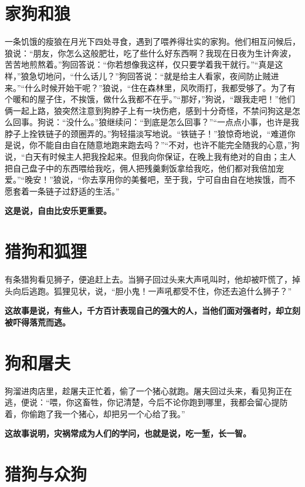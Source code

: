 \section{家狗和狼}

一条饥饿的瘦狼在月光下四处寻食，遇到了喂养得壮实的家狗。他们相互问候后，狼说：“朋友，你怎么这般肥壮，吃了些什么好东西啊？我现在日夜为生计奔波，苦苦地煎熬着。”狗回答说：“你若想像我这样，仅只要学着我干就行。”“真是这样，”狼急切地问，“什么话儿？”狗回答说：“就是给主人看家，夜间防止贼进来。”“什么时候开始干呢？”狼说，“住在森林里，风吹雨打，我都受够了。为了有个暖和的屋子住，不挨饿，做什么我都不在乎。”“那好，”狗说，“跟我走吧！”他们俩一起上路，狼突然注意到狗脖子上有一块伤疤，感到十分奇怪，不禁问狗这是怎么回事。狗说：“没什么。”狼继续问：“到底是怎么回事？”“一点点小事，也许是我脖子上拴铁链子的颈圈弄的。”狗轻描淡写地说。“铁链子！”狼惊奇地说，“难道你是说，你不能自由自在随意地跑来跑去吗？”“不对，也许不能完全随我的心意，”狗说，“白天有时候主人把我拴起来。但我向你保证，在晚上我有绝对的自由；主人把自己盘子中的东西喂给我吃，佣人把残羹剩饭拿给我吃，他们都对我倍加宠爱。”“晚安！”狼说，“你去享用你的美餐吧，至于我，宁可自由自在地挨饿，而不愿套着一条链子过舒适的生活。”

{\bfseries \color{red}这是说，自由比安乐更重要。}

\section{猎狗和狐狸}

有条猎狗看见狮子，便追赶上去。当狮子回过头来大声吼叫时，他却被吓慌了，掉头向后逃跑。狐狸见状，说，“胆小鬼！一声吼都受不住，你还去追什么狮子？”

{\bfseries \color{red}这故事是说，有些人，千方百计表现自己的强大的人，当他们面对强者时，却立刻被吓得落荒而逃。}

\section{狗和屠夫}

狗溜进肉店里，趁屠夫正忙着，偷了一个猪心就跑。屠夫回过头来，看见狗正在逃，便说：“喂，你这畜牲，你记清楚，今后不论你跑到哪里，我都会留心提防着，你偷跑了我一个猪心，却把另一个心给了我。”

{\bfseries \color{red}这故事说明，灾祸常成为人们的学问，也就是说，吃一堑，长一智。}

\section{猎狗与众狗}

